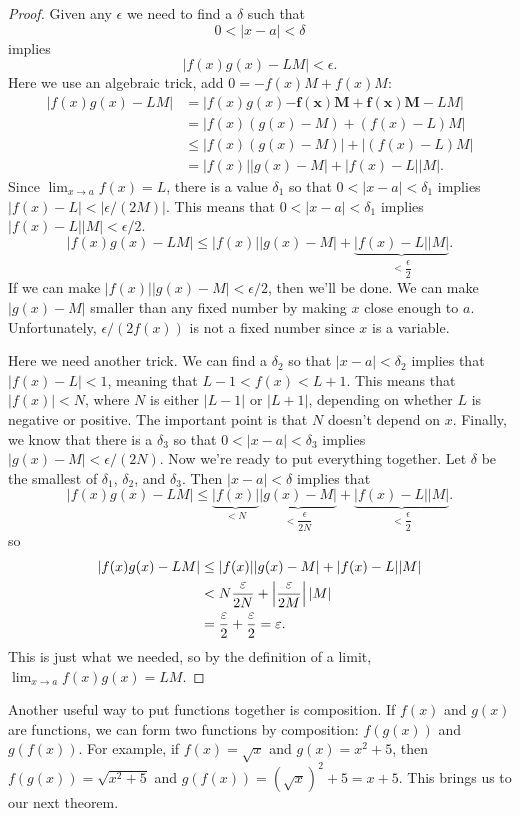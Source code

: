 \begin{proof} 
Given any $\epsilon$ we need to find a $\delta$ such that
\[
0<|x - a|< \delta
\]
implies 
\[
|f(x)g(x)-LM|< \epsilon.  
\]
Here we use an algebraic trick, add $0 = -f(x)M+f(x)M$:
\begin{align*}
|f(x)g(x)-LM| &= |f(x)g(x)\boldsymbol{-f(x)M+f(x)M}-LM| \\
&=|f(x)(g(x)-M)+(f(x)-L)M| \\
&\le |f(x)(g(x)-M)|+|(f(x)-L)M| \\
&=|f(x)||g(x)-M|+|f(x)-L||M|.
\end{align*}
Since $\lim_{x\to a}f(x) =L$, there is a value $\delta_1$ so that
$0<|x-a|<\delta_1$ implies $|f(x)-L|<|\epsilon/(2M)|$. This means that
$0<|x-a|<\delta_1$ implies $|f(x)-L||M|< \epsilon/2$. 
\[
|f(x)g(x)-LM|\le|f(x)||g(x)-M|+\underbrace{|f(x)-L||M|}_{<\dfrac{\epsilon}{2}}.
\]
If we can make $|f(x)||g(x)-M|<\epsilon/2$, then we'll be done. We can
make $|g(x)-M|$ smaller than any fixed number by making $x$ close
enough to $a$. Unfortunately, $\epsilon/(2f(x))$ is not a fixed number
since $x$ is a variable.

Here we need another trick. We can find a $\delta_2$ so that
$|x-a|<\delta_2$ implies that $|f(x)-L|<1$, meaning that $L-1 < f(x) <
L+1$. This means that $|f(x)|<N$, where $N$ is either $|L-1|$ or
$|L+1|$, depending on whether $L$ is negative or positive. The
important point is that $N$ doesn't depend on $x$. Finally, we know
that there is a $\delta_3$ so that $0<|x-a|<\delta_3$ implies
$|g(x)-M|<\epsilon/(2N)$. Now we're ready to put everything
together. Let $\delta$ be the smallest of $\delta_1$, $\delta_2$, and
$\delta_3$. Then $|x-a|<\delta$ implies that
\[
|f(x)g(x)-LM|\le\underbrace{|f(x)|}_{<N}\underbrace{|g(x)-M|}_{<\dfrac{\epsilon}{2N}}+\underbrace{|f(x)-L||M|}_{<\dfrac{\epsilon}{2}}.
\]
so
\begin{align*}
|f(x)g(x)-LM|&\le|f(x)||g(x)-M|+|f(x)-L||M| \\
&<N{\epsilon\over 2N}+\left|{\epsilon\over 2M}\right||M| \\
&={\epsilon\over 2}+{\epsilon\over 2}=\epsilon.
\end{align*}
This is just what we needed, so by the definition of a limit,
$\lim_{x\to a}f(x)g(x)=LM$.
\end{proof}



Another useful way to put functions together is
composition. If $f(x)$ and $g(x)$ are
functions, we can form two functions by composition: $f(g(x))$ and
$g(f(x))$. For example, if $f(x)=\sqrt{x}$ and $g(x)=x^2+5$, then
$f(g(x))=\sqrt{x^2+5}$ and $g(f(x))=(\sqrt{x})^2+5=x+5$.  This brings
us to our next theorem.

